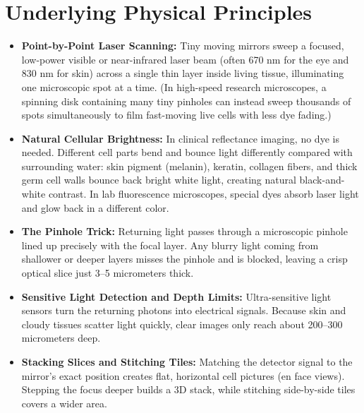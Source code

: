 \section{Underlying Physical Principles}
\begin{itemize}
    \item \textbf{Point-by-Point Laser Scanning:} Tiny moving mirrors sweep a focused, low-power visible or near-infrared laser beam (often 670 nm for the eye and 830 nm for skin) across a single thin layer inside living tissue, illuminating one microscopic spot at a time. (In high-speed research microscopes, a spinning disk containing many tiny pinholes can instead sweep thousands of spots simultaneously to film fast-moving live cells with less dye fading.)
    \item \textbf{Natural Cellular Brightness:} In clinical reflectance imaging, no dye is needed. Different cell parts bend and bounce light differently compared with surrounding water: skin pigment (melanin), keratin, collagen fibers, and thick germ cell walls bounce back bright white light, creating natural black-and-white contrast. In lab fluorescence microscopes, special dyes absorb laser light and glow back in a different color.
    \item \textbf{The Pinhole Trick:} Returning light passes through a microscopic pinhole lined up precisely with the focal layer. Any blurry light coming from shallower or deeper layers misses the pinhole and is blocked, leaving a crisp optical slice just 3--5 micrometers thick.
    \item \textbf{Sensitive Light Detection and Depth Limits:} Ultra-sensitive light sensors turn the returning photons into electrical signals. Because skin and cloudy tissues scatter light quickly, clear images only reach about 200--300 micrometers deep.
    \item \textbf{Stacking Slices and Stitching Tiles:} Matching the detector signal to the mirror's exact position creates flat, horizontal cell pictures (en face views). Stepping the focus deeper builds a 3D stack, while stitching side-by-side tiles covers a wider area.
\end{itemize}

